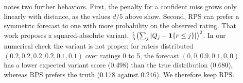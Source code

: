 \citet{galdran2023performance} notes two further behaviors.
First, the penalty for a confident miss grows only linearly with distance, as the values $d/5$ above show.
Second, RPS can prefer a symmetric forecast to one with more probability on the observed rating.
That work proposes a squared-absolute variant, $\frac15\bigl(\sum_j|Q_j-\mathbf{1}\{r\le j\}|\bigr)^2$.
In our numerical check the variant is not proper: for raters distributed $(0.2,0.2,0.2,0.2,0.1,0.1)$ over ratings 0 to 5, the forecast $(0,0,0.9,0.1,0,0)$ has a lower expected variant score (0.498) than the true distribution (0.680), whereas RPS prefers the truth (0.178 against 0.246).
We therefore keep RPS.
